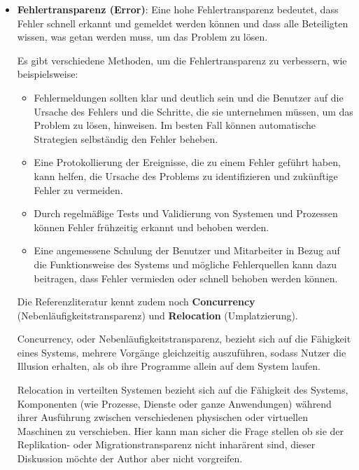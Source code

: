\documentclass[../vs-script-first-v01.tex]{subfiles}
\begin{document}
\begin{itemize}
  \item \textbf{Fehlertransparenz (Error)}: Eine hohe Fehlertransparenz bedeutet, dass Fehler schnell erkannt und gemeldet werden können und dass alle Beteiligten wissen, was getan werden muss, um das Problem zu lösen.

        Es gibt verschiedene Methoden, um die Fehlertransparenz zu verbessern, wie beispielsweise:
        \begin{itemize}
          \item Fehlermeldungen sollten klar und deutlich sein und die Benutzer auf die Ursache des Fehlers und die Schritte, die sie unternehmen müssen, um das Problem zu lösen, hinweisen. Im besten Fall können automatische Strategien selbständig den Fehler beheben.

          \item Eine Protokollierung der Ereignisse, die zu einem Fehler geführt haben, kann helfen, die Ursache des Problems zu identifizieren und zukünftige Fehler zu vermeiden.

          \item Durch regelmäßige Tests und Validierung von Systemen und Prozessen können Fehler frühzeitig erkannt und behoben werden.

          \item Eine angemessene Schulung der Benutzer und Mitarbeiter in Bezug auf die Funktionsweise des Systems und mögliche Fehlerquellen kann dazu beitragen, dass Fehler vermieden oder schnell behoben werden können.
        \end{itemize}
        Die Referenzliteratur kennt zudem noch \textbf{Concurrency} (Nebenläufigkeitstransparenz) und \textbf{Relocation} (Umplatzierung). 

        Concurrency, oder Nebenläufigkeitstransparenz, bezieht sich auf die Fähigkeit eines Systems, mehrere Vorgänge gleichzeitig auszuführen, sodass Nutzer die Illusion erhalten, als ob ihre Programme allein auf dem System laufen. 

        Relocation in verteilten Systemen bezieht sich auf die Fähigkeit des Systems, Komponenten (wie Prozesse, Dienste oder ganze Anwendungen) während ihrer Ausführung zwischen verschiedenen physischen oder virtuellen Maschinen zu verschieben. Hier kann man sicher die Frage stellen ob sie der Replikation- oder Migrationstransparenz nicht inharärent sind, dieser Diskussion möchte der Author aber nicht vorgreifen.

\end{itemize}
\end{document}
